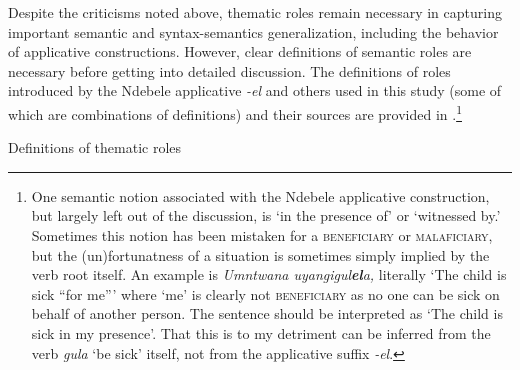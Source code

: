 \documentclass[output=paper]{langsci/langscibook}
\begin{document}
  Despite the criticisms noted above, thematic roles remain necessary in capturing important semantic and syntax-semantics generalization, including the behavior of applicative constructions. However, clear definitions of semantic roles are necessary before getting into detailed discussion. The definitions of roles introduced by the Ndebele applicative \textit{{}-el} and others used in this study (some of which are combinations of definitions) and their sources are provided in .\footnote{ One semantic notion associated with the Ndebele applicative construction, but largely left out of the discussion, is ‘in the presence of’ or ‘witnessed by.’ Sometimes this notion has been mistaken for a \textsc{beneficiary} or \textsc{malaficiary}, but the (un)fortunatness of a situation is sometimes simply implied by the verb root itself. An example is \textit{Umntwana uyangigul}\textbf{\textit{el}}\textit{a,} literally ‘The child is sick “for me”’ where ‘me’ is clearly not \textsc{beneficiary} as no one can be sick on behalf of another person. The sentence should be interpreted as ‘The child is sick in my presence’. That this is to my detriment can be inferred from the verb \textit{gula} ‘be sick’ itself, not from the applicative suffix \textit{{}-el}.} 

\begin{stylelsTableHeading}%
\begin{table}
\caption{Definitions of thematic roles}
\label{tab:1}
\end{table}\end{stylelsTableHeading}
\end{document}
